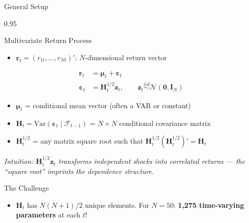 \documentclass[9pt, aspectratio=169, t]{beamer}
\begin{document}
\begin{frame}{General Setup}
    \begin{cminipage}{0.95\textwidth}
    {\footnotesize
    \begin{block}{Multivariate Return Process}
        \begin{itemize}\setlength{\itemsep}{0pt}
            \item $\mathbf{r}_t = (r_{1t}, \ldots, r_{Nt})'$: $N$-dimensional return vector
        \end{itemize}
        \vspace{-2mm}
        \begin{align}
            \mathbf{r}_t &= \boldsymbol{\mu}_t + \boldsymbol{\varepsilon}_t \\
            \boldsymbol{\varepsilon}_t &= \mathbf{H}_t^{1/2} \mathbf{z}_t, \qquad \mathbf{z}_t \overset{iid}{\sim} \mathcal{N}(\mathbf{0}, \mathbf{I}_N)
        \end{align}
        \vspace{-2mm}
        \begin{itemize}\setlength{\itemsep}{0pt}
            \item $\boldsymbol{\mu}_t$ = conditional mean vector (often a VAR or constant)
            \item $\mathbf{H}_t = \text{Var}(\boldsymbol{\varepsilon}_t \mid \mathcal{F}_{t-1})$ = $N \times N$ conditional covariance matrix
            \item $\mathbf{H}_t^{1/2}$ = any matrix square root such that $\mathbf{H}_t^{1/2}(\mathbf{H}_t^{1/2})' = \mathbf{H}_t$
        \end{itemize}
        \textit{Intuition: $\mathbf{H}_t^{1/2}\mathbf{z}_t$ transforms independent shocks into correlated returns --- the ``square root'' imprints the dependence structure.}
    \end{block}
    \begin{alertblock}{The Challenge}
        \begin{itemize}\setlength{\itemsep}{0pt}
            \item $\mathbf{H}_t$ has $N(N+1)/2$ unique elements. For $N=50$: \textbf{1,275 time-varying parameters} at each $t$!
        \end{itemize}
    \end{alertblock}
    }
    \end{cminipage}
\end{frame}
\end{document}
